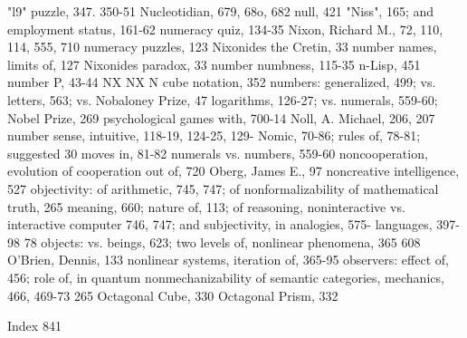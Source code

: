 "l9" puzzle, 347. 350-51                         Nucleotidian, 679, 68o, 682 null, 421
"Niss", 165; and employment status, 161-62       numeracy quiz, 134-35
Nixon, Richard M., 72, 110, 114, 555, 710        numeracy puzzles, 123
Nixonides the Cretin, 33                         number names, limits of, 127
Nixonides paradox, 33                            number numbness, 115-35
n-Lisp, 451                                      number P, 43-44
NX NX N cube notation, 352                       numbers: generalized, 499; vs. letters, 563; vs.
Nobaloney Prize, 47                               logarithms, 126-27; vs. numerals, 559-60;
Nobel Prize, 269                                  psychological games with, 700-14
Noll, A. Michael, 206, 207                       number sense, intuitive, 118-19, 124-25, 129-
Nomic, 70-86; rules of, 78-81; suggested          30
 moves in, 81-82                                 numerals vs. numbers, 559-60
noncooperation, evolution of cooperation out
 of, 720                                         Oberg, James E., 97
noncreative intelligence, 527                    objectivity: of arithmetic, 745, 747; of
nonformalizability of mathematical truth, 265     meaning, 660; nature of, 113; of reasoning,
noninteractive vs. interactive computer           746, 747; and subjectivity, in analogies, 575-
 languages, 397-98                                78 objects: vs. beings, 623; two levels of,
nonlinear phenomena, 365                          608 O'Brien, Dennis, 133
nonlinear systems, iteration of, 365-95          observers: effect of, 456; role of, in quantum
nonmechanizability of semantic categories,        mechanics, 466, 469-73
 265                                             Octagonal Cube, 330 Octagonal Prism, 332

 Index                                                                                      841

